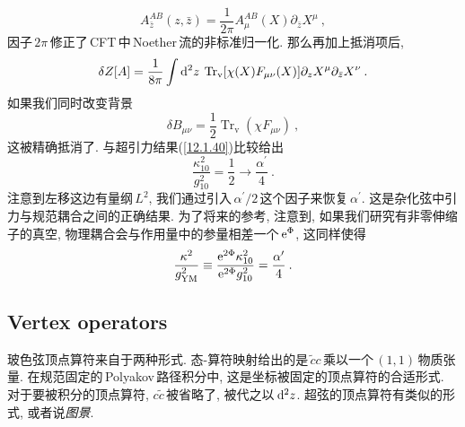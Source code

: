 \begin{equation}
    A_{\bar{z}}^{AB}(z,\bar{z})=\frac{1}{2\pi}A_{\mu}^{AB}(X)\partial_{\bar{z}}X^{\mu} \:, \label{12.3.33}
\end{equation}
因子$\,2\pi\,$修正了\,CFT\,中\,Noether\,流的非标准归一化. 那么再加上抵消项后,
\begin{equation}
    \delta Z[A] = \frac{1}{8\pi}\int \mathrm{d}^{2}z\: \operatorname{Tr}_{\mathrm{v}}[\chi(X)F_{\mu\nu}(X)]\partial_{z}X^{\mu}\partial_{\bar{z}}X^{\nu} \:. \label{12.3.34}
\end{equation}
如果我们同时改变背景
\begin{equation}
    \delta B_{\mu\nu} = \frac{1}{2}\operatorname{Tr}_{\mathrm{v}}(\chi F_{\mu\nu}) \:, \label{12.3.35}
\end{equation}
这被精确抵消了. 与超引力结果(\ref{12.1.40})比较给出
\begin{equation}
    \frac{\kappa_{10}^{2}}{g_{10}^{2}} = \frac{1}{2} \to \frac{\alpha^{\prime}}{4} \:. \label{12.3.36}
\end{equation}
注意到左移这边有量纲$\,L^{2}$, 我们通过引入$\,\alpha^{\prime}/2\,$这个因子来恢复$\,\alpha^{\prime}$. 这是杂化弦中引力与规范耦合之间的正确结果. 为了将来的参考, 注意到, 如果我们研究有非零伸缩子的真空, 物理耦合会与作用量中的参量相差一个$\,\mathrm{e}^{\Phi}$, 这同样使得
\begin{equation}
    \frac{\kappa^{2}}{g^{2}_{\mathrm{YM}}} \equiv \frac{\mathrm{e}^{2\Phi}\kappa_{10}^{2}}{\mathrm{e}^{2\Phi}g_{10}^{2}}=\frac{\alpha^{\prime}}{4} \:. \label{12.3.37}
\end{equation}

\subsection*{Vertex operators}

玻色弦顶点算符来自于两种形式. 态-算符映射给出的是$\,\tilde{c}c\,$乘以一个\,$(1,1)$\,物质张量. 在规范固定的\,Polyakov\,路径积分中, 这是坐标被固定的顶点算符的合适形式. 对于要被积分的顶点算符, $c\tilde{c}\,$被省略了, 被代之以$\,\mathrm{d}^{2}z$. 超弦的顶点算符有类似的形式, 或者说{\emph{图景}}.

